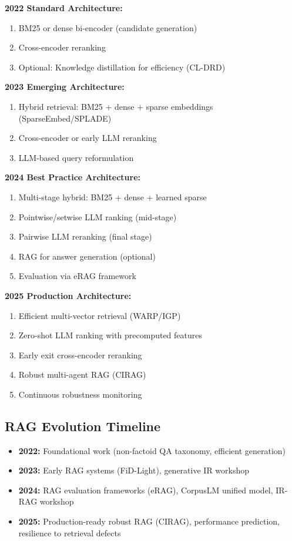 \documentclass[11pt,letterpaper]{article}
\begin{document}
\textbf{2022 Standard Architecture:}
\begin{enumerate}
    \item BM25 or dense bi-encoder (candidate generation)
    \item Cross-encoder reranking
    \item Optional: Knowledge distillation for efficiency (CL-DRD)
\end{enumerate}

\textbf{2023 Emerging Architecture:}
\begin{enumerate}
    \item Hybrid retrieval: BM25 + dense + sparse embeddings (SparseEmbed/SPLADE)
    \item Cross-encoder or early LLM reranking
    \item LLM-based query reformulation
\end{enumerate}

\textbf{2024 Best Practice Architecture:}
\begin{enumerate}
    \item Multi-stage hybrid: BM25 + dense + learned sparse
    \item Pointwise/setwise LLM ranking (mid-stage)
    \item Pairwise LLM reranking (final stage)
    \item RAG for answer generation (optional)
    \item Evaluation via eRAG framework
\end{enumerate}

\textbf{2025 Production Architecture:}
\begin{enumerate}
    \item Efficient multi-vector retrieval (WARP/IGP)
    \item Zero-shot LLM ranking with precomputed features
    \item Early exit cross-encoder reranking
    \item Robust multi-agent RAG (CIRAG)
    \item Continuous robustness monitoring
\end{enumerate}

\subsection{RAG Evolution Timeline}

\begin{itemize}[leftmargin=*]
    \item \textbf{2022:} Foundational work (non-factoid QA taxonomy, efficient generation)
    \item \textbf{2023:} Early RAG systems (FiD-Light), generative IR workshop
    \item \textbf{2024:} RAG evaluation frameworks (eRAG), CorpusLM unified model, IR-RAG workshop
    \item \textbf{2025:} Production-ready robust RAG (CIRAG), performance prediction, resilience to retrieval defects
\end{itemize}
\end{document}

